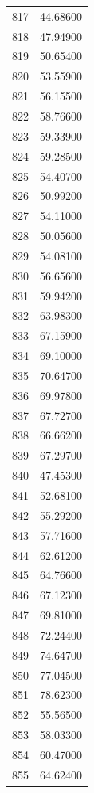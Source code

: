 \documentclass[
  letterpaper,
  DIV=11,
  numbers=noendperiod]{scrreprt}
\begin{document}
\begin{tcolorbox}
\begin{tabular}{lr}
817  &         44.68600 \\
818  &         47.94900 \\
819  &         50.65400 \\
820  &         53.55900 \\
821  &         56.15500 \\
822  &         58.76600 \\
823  &         59.33900 \\
824  &         59.28500 \\
825  &         54.40700 \\
826  &         50.99200 \\
827  &         54.11000 \\
828  &         50.05600 \\
829  &         54.08100 \\
830  &         56.65600 \\
831  &         59.94200 \\
832  &         63.98300 \\
833  &         67.15900 \\
834  &         69.10000 \\
835  &         70.64700 \\
836  &         69.97800 \\
837  &         67.72700 \\
838  &         66.66200 \\
839  &         67.29700 \\
840  &         47.45300 \\
841  &         52.68100 \\
842  &         55.29200 \\
843  &         57.71600 \\
844  &         62.61200 \\
845  &         64.76600 \\
846  &         67.12300 \\
847  &         69.81000 \\
848  &         72.24400 \\
849  &         74.64700 \\
850  &         77.04500 \\
851  &         78.62300 \\
852  &         55.56500 \\
853  &         58.03300 \\
854  &         60.47000 \\
855  &         64.62400 \\

\end{tabular}
\end{tcolorbox}
\end{document}
